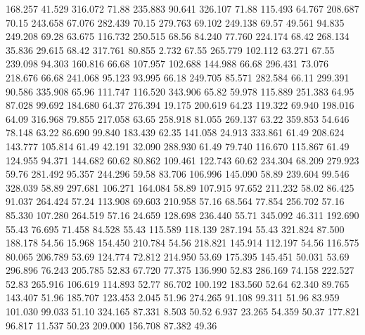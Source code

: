  168.257   41.529  316.072        71.88
 235.883   90.641  326.107        71.88
 115.493   64.767  208.687        70.15
 243.658   67.076  282.439        70.15
 279.763   69.102  249.138        69.57
  49.561   94.835  249.208        69.28
  63.675  116.732  250.515        68.56
  84.240   77.760  224.174        68.42
 268.134   35.836   29.615        68.42
 317.761   80.855    2.732        67.55
 265.779  102.112   63.271        67.55
 239.098   94.303  160.816        66.68
 107.957  102.688  144.988        66.68
 296.431   73.076  218.676        66.68
 241.068   95.123   93.995        66.18
 249.705   85.571  282.584        66.11
 299.391   90.586  335.908        65.96
 111.747  116.520  343.906        65.82
  59.978  115.889  251.383        64.95
  87.028   99.692  184.680        64.37
 276.394   19.175  200.619        64.23
 119.322   69.940  198.016        64.09
 316.968   79.855  217.058        63.65
 258.918   81.055  269.137        63.22
 359.853   54.646   78.148        63.22
  86.690   99.840  183.439        62.35
 141.058   24.913  333.861        61.49
 208.624  143.777  105.814        61.49
  42.191   32.090  288.930        61.49
  79.740  116.670  115.867        61.49
 124.955   94.371  144.682        60.62
  80.862  109.461  122.743        60.62
 234.304   68.209  279.923        59.76
 281.492   95.357  244.296        59.58
  83.706  106.996  145.090        58.89
 239.604   99.546  328.039        58.89
 297.681  106.271  164.084        58.89
 107.915   97.652  211.232        58.02
  86.425   91.037  264.424        57.24
 113.908   69.603  210.958        57.16
  68.564   77.854  256.702        57.16
  85.330  107.280  264.519        57.16
  24.659  128.698  236.440        55.71
 345.092   46.311  192.690        55.43
  76.695   71.458   84.528        55.43
 115.589  118.139  287.194        55.43
 321.824   87.500  188.178        54.56
  15.968  154.450  210.784        54.56
 218.821  145.914  112.197        54.56
 116.575   80.065  206.789        53.69
 124.774   72.812  214.950        53.69
 175.395  145.451   50.031        53.69
 296.896   76.243  205.785        52.83
  67.720   77.375  136.990        52.83
 286.169   74.158  222.527        52.83
 265.916  106.619  114.893        52.77
  86.702  100.192  183.560        52.64
  62.340   89.765  143.407        51.96
 185.707  123.453    2.045        51.96
 274.265   91.108   99.311        51.96
  83.959  101.030   99.033        51.10
 324.165   87.331    8.503        50.52
   6.937   23.265   54.359        50.37
 177.821   96.817   11.537        50.23
 209.000  156.708   87.382        49.36

